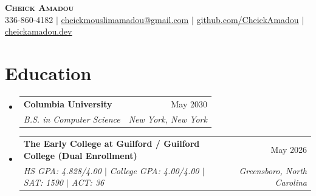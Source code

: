 \documentclass[letterpaper,11pt]{article}
\makeatletter
\newcommand{\resumeSubheading}[4]{
  \vspace{-2pt}\item
    \begin{tabular*}{0.97\textwidth}[t]{l@{\extracolsep{\fill}}r}
      \textbf{#1} & #2 \\
      \textit{\small#3} & \textit{\small #4} \\
    \end{tabular*}\vspace{-7pt}
}
\newcommand{\resumeSubHeadingListStart}{\begin{itemize}[leftmargin=0.15in, label={}]}
\newcommand{\resumeSubHeadingListEnd}{\end{itemize}}
\makeatother
\begin{document}
\begin{center}
    \textbf{\Huge \scshape Cheick Amadou} \\ \vspace{1pt}
    \small 336-860-4182 $|$ \href{mailto:cheickmouslimamadou@gmail.com}{\underline{cheickmouslimamadou@gmail.com}} $|$ \href{https://github.com/CheickAmadou}{\underline{github.com/CheickAmadou}} $|$ \href{https://cheickamadou.dev}{\underline{cheickamadou.dev}}
\end{center}

\section{Education}
  \resumeSubHeadingListStart
    \resumeSubheading
      {Columbia University}{May 2030}
      {B.S. in Computer Science}{New York, New York}
    \resumeSubheading
      {The Early College at Guilford / Guilford College (Dual Enrollment)}{May 2026}
      {HS GPA: 4.828/4.00 $|$ College GPA: 4.00/4.00 $|$ SAT: 1590 $|$ ACT: 36}{Greensboro, North Carolina}
  \resumeSubHeadingListEnd



\end{document}
